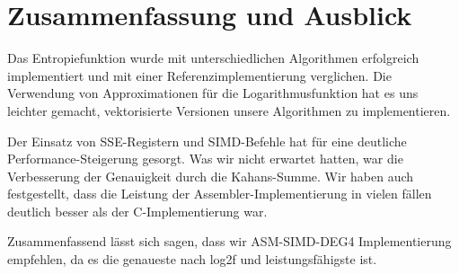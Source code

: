 \section{Zusammenfassung und Ausblick}
Das Entropiefunktion wurde mit unterschiedlichen Algorithmen erfolgreich implementiert und mit einer Referenzimplementierung verglichen. Die Verwendung von Approximationen für die Logarithmusfunktion hat es uns leichter gemacht, vektorisierte Versionen unsere Algorithmen zu implementieren.

Der Einsatz von SSE-Registern und SIMD-Befehle hat für eine deutliche Performance-Steigerung gesorgt.  Was wir nicht erwartet hatten, war die Verbesserung der Genauigkeit durch die Kahans-Summe. Wir haben auch festgestellt, dass die Leistung der Assembler-Implementierung in vielen fällen deutlich besser als der C-Implementierung war.

Zusammenfassend lässt sich sagen, dass wir ASM-SIMD-DEG4 Implementierung empfehlen, da es die genaueste nach log2f und leistungsfähigste ist.

\newpage